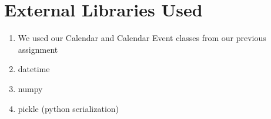 \documentclass[11pt]{article} %
\begin{document}
\section{External Libraries Used}
\begin{enumerate}
\item We used our Calendar and Calendar Event classes from our previous assignment
\item datetime
\item numpy
\item pickle (python serialization)
\end{enumerate}
\end{document}
